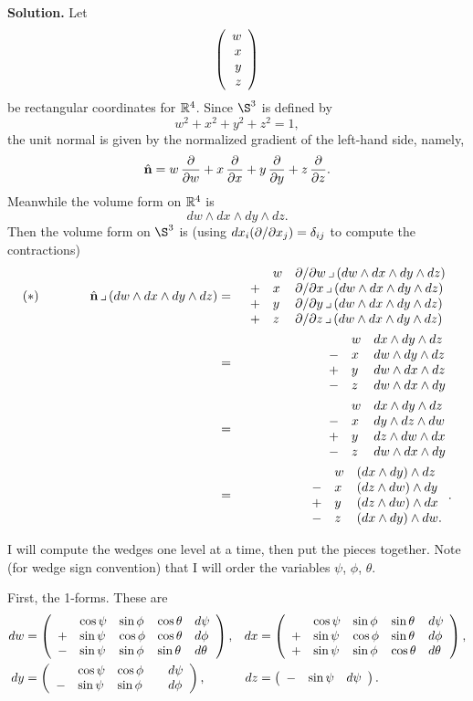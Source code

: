 \documentclass[10pt]{article}
\numberwithin{equation}{subsection}
\begin{document}
\textbf{Solution.}  Let
$$
	\left(\begin{array}{r} w \\ x \\ y \\ z\end{array}\right)
$$
be rectangular coordinates for $\mathbb{R}^4$.  Since $\S^3$ is defined by
$$
	w^2 + x^2 + y^2 + z^2 = 1,
$$
the unit normal is given by the normalized gradient of the left-hand side,
namely,
$$
	\hat{\mathbf{n}} =
	w \,\frac{\partial}{\partial w} +
	x \,\frac{\partial}{\partial x} +
	y \,\frac{\partial}{\partial y} +
	z \,\frac{\partial}{\partial z}.
$$
Meanwhile the volume form on $\mathbb{R}^4$ is
$$
	dw \wedge dx \wedge dy \wedge dz.
$$
Then the volume form on $\S^3$ is (using $dx_i(\partial/\partial x_j) = \delta_{ij}$ to
compute the contractions)
\begin{eqnarray*}
	(*)\qquad\qquad
	\nhat \ctt (dw \wedge dx \wedge dy \wedge dz)
	&=& \ulmatrix{
		&  w &\slashDw \ctt (dw \wedge dx \wedge dy \wedge dz) \\
		+& x &\slashDx \ctt (dw \wedge dx \wedge dy \wedge dz) \\
		+& y &\slashDy \ctt (dw \wedge dx \wedge dy \wedge dz) \\
		+& z &\slashDz \ctt (dw \wedge dx \wedge dy \wedge dz)
		} \\
%
	&=& \ulmatrix{
		&  w& dx \wedge dy \wedge dz \\
		-& x& dw \wedge dy \wedge dz \\
		+& y& dw \wedge dx \wedge dz \\
		-& z& dw \wedge dx \wedge dy
		} \\
%
	&=& \ulmatrix{
		&  w & dx \wedge dy \wedge dz \\
		-& x & dy \wedge dz \wedge dw \\
		+& y & dz \wedge dw \wedge dx \\
		-& z & dw \wedge dx \wedge dy \\
		} \\
%
	&=& \ulmatrix{
		&  w & (dx \wedge dy) \wedge dz \\
		-& x & (dz \wedge dw) \wedge dy \\
		+& y & (dz \wedge dw) \wedge dx \\
		-& z & (dx \wedge dy) \wedge dw.
		}.
\end{eqnarray*}

I will compute the wedges one level at a time, then put the pieces together.
Note (for wedge sign convention) that I will order the variables $\psi$,
$\phi$, $\theta$.

First, the 1-forms.  These are
\begin{align*}
	dw	&= \left(\begin{array}{llllllllllll} 
		 	&  \cos\psi & \sin\phi & \cos\theta & d\psi \\
			+& \sin\psi & \cos\phi & \cos\theta & d\phi \\
			-& \sin\psi & \sin\phi & \sin\theta & d\theta
		 \end{array}\right),
	&
	dx	&= \left(\begin{array}{llllllllllll} 
			&  \cos\psi & \sin\phi & \sin\theta & d\psi \\
			+& \sin\psi & \cos\phi & \sin\theta & d\phi \\
			+& \sin\psi & \sin\phi & \cos\theta & d\theta
		 \end{array}\right),
	\\
	dy	&= \left(\begin{array}{llllllllllll} 
		&  \cos\psi & \cos\phi &    & d\psi \\
		-& \sin\psi & \sin\phi &    & d\phi
		 \end{array}\right),
	&
	dz	&= \left(\begin{array}{llllllllllll} 
		-&  \sin\psi & d\psi
		 \end{array}\right).
\end{align*}
\end{document}
